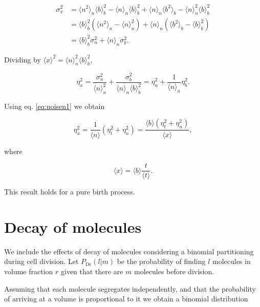\begin{equation*}
  \begin{split}
    \sigma_x^2 &= \langle n^2\rangle_n\langle b\rangle_b^2-\langle n\rangle_n\langle b\rangle_b^2+\langle n\rangle_n\langle b^2\rangle_b - \langle n\rangle_n^2\langle b\rangle_b^2\\
    &=\langle b\rangle_b^2\left(\langle n^2\rangle_n-\langle n\rangle^2_n\right) + \langle n\rangle_n\left(\langle b^2\rangle_b-\langle b\rangle_b^2\right)\\
    &=\langle b\rangle_b^2\sigma_n^2 + \langle n\rangle_n\sigma_b^2.
  \end{split}
\end{equation*}

Dividing by $\langle x\rangle^2=\langle n\rangle_n^2\langle b\rangle_b^2$,

\begin{equation*}
  \eta_x^2=\frac{\sigma_n^2}{\langle n\rangle_n^2} + \frac{\sigma_b^2}{\langle n\rangle_n\langle b\rangle_b^2} = \eta_n^2+\frac{1}{\langle n\rangle_n}\eta_b^2.
\end{equation*}

Using eq. \ref{eq:noisen1} we obtain

\begin{equation}
  \label{eq:noisex}
  \eta_x^2=\frac{1}{\langle n\rangle}\left(\eta_t^2+\eta_n^2\right)=\frac{\langle b\rangle\left(\eta_t^2+\eta_n^2\right)}{\langle x\rangle},
\end{equation}

where

\begin{equation}
  \langle x\rangle = \langle b\rangle\frac{t}{\langle t\rangle}.
\end{equation}

This result holds for a pure birth process.

\section{Decay of molecules}

We include the effects of decay of molecules considering a binomial partitioning during cell division. Let $P_\text{Dr}(l|m)$ be the probability of finding $l$ molecules in volume fraction $r$ given that there are $m$ molecules before division.

Assuming that each molecule segregates independently, and that the probability of arriving at a volume is proportional to it we obtain a binomial distribution

